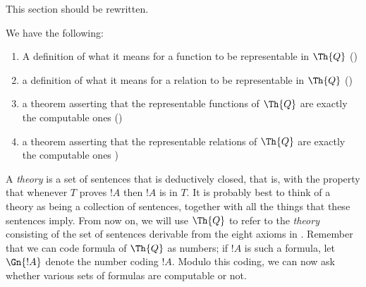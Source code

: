 \documentclass[../../../include/open-logic-section]{subfiles}
\begin{document}

\begin{editorial}
This section should be rewritten.  
\end{editorial}

We have the following:
\begin{enumerate}
\item A definition of what it means for a function to be representable
  in $\Th{Q}$ ()
\item a definition of what it means for a relation to be representable
  in $\Th{Q}$ ()
\item a theorem asserting that the representable functions of $\Th{Q}$
  are exactly the computable ones
  ()
\item a theorem asserting that the representable relations of $\Th{Q}$
  are exactly the computable ones
  )
\end{enumerate}

A {\em theory} is a set of sentences that is deductively closed, that
is, with the property that whenever $T$ proves $!A$ then $!A$ is in
$T$. It is probably best to think of a theory as being a collection of
sentences, together with all the things that these sentences imply.
From now on, we will use $\Th{Q}$ to refer to the {\em theory}
consisting of the set of sentences derivable from the eight axioms in
.  Remember that we can code formula of $\Th{Q}$
as numbers; if $!A$ is such a formula, let $\Gn{!A}$ denote the number
coding $!A$. Modulo this coding, we can now ask whether various sets
of formulas are computable or not.
\end{document}
